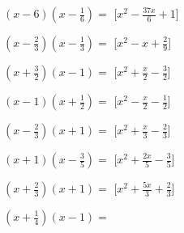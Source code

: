 \begin{esercizio}
\begin{multicols}{2}
\begin{enumeratea}
\item \(\left(x - 6\right)\left(x - \frac{1}{6}\right)=\)
  \hfill [\(x^{2} - \frac{37 x}{6} + 1\)]
\item \(\left(x - \frac{2}{3}\right)\left(x - \frac{1}{3}\right)=\)
  \hfill [\(x^{2} - x + \frac{2}{9}\)]
\item \(\left(x + \frac{3}{2}\right)\left(x - 1\right)=\)
  \hfill [\(x^{2} + \frac{x}{2} - \frac{3}{2}\)]
\item \(\left(x - 1\right)\left(x + \frac{1}{2}\right)=\)
  \hfill [\(x^{2} - \frac{x}{2} - \frac{1}{2}\)]
\item \(\left(x - \frac{2}{3}\right)\left(x + 1\right)=\)
  \hfill [\(x^{2} + \frac{x}{3} - \frac{2}{3}\)]
\item \(\left(x + 1\right)\left(x - \frac{3}{5}\right)=\)
  \hfill [\(x^{2} + \frac{2 x}{5} - \frac{3}{5}\)]
\item \(\left(x + \frac{2}{3}\right)\left(x + 1\right)=\)
  \hfill [\(x^{2} + \frac{5 x}{3} + \frac{2}{3}\)]
\item \(\left(x + \frac{1}{4}\right)\left(x - 1\right)=\)

\end{enumeratea}
\end{multicols}
\end{esercizio}
